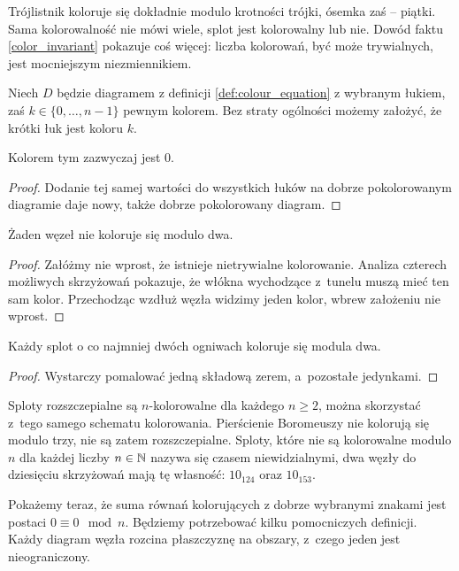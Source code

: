 Trójlistnik koloruje się dokładnie modulo krotności trójki, ósemka zaś -- piątki.
Sama kolorowalność nie mówi wiele, splot jest kolorowalny lub nie.
Dowód faktu \ref{color_invariant} pokazuje coś więcej: liczba kolorowań, być może trywialnych, jest mocniejszym niezmiennikiem.

\begin{lemma}
    \label{lem:colouring_arc}
    Niech $D$ będzie diagramem z definicji \ref{def:colour_equation} z wybranym łukiem, zaś $k \in \{0, \ldots, n - 1\}$ pewnym kolorem.
    Bez straty ogólności możemy założyć, że krótki łuk jest koloru $k$.
\end{lemma}

Kolorem tym zazwyczaj jest $0$.

\begin{proof}
    Dodanie tej samej wartości do wszystkich łuków na dobrze pokolorowanym diagramie daje nowy, także dobrze pokolorowany diagram.
\end{proof}

\begin{proposition}
    \label{no_knots_colours_mod_two}
    Żaden węzeł nie koloruje się modulo dwa.
\end{proposition}

\begin{proof}
    Załóżmy nie wprost, że istnieje nietrywialne kolorowanie.
    Analiza czterech możliwych skrzyżowań pokazuje, że włókna wychodzące z~tunelu muszą mieć ten sam kolor.
    Przechodząc wzdłuż węzła widzimy jeden kolor, wbrew założeniu nie wprost.
\end{proof}

\begin{proposition}
    Każdy splot o co najmniej dwóch ogniwach koloruje się modula dwa.
\end{proposition}

\begin{proof}
    Wystarczy pomalować jedną składową zerem, a~pozostałe jedynkami.
\end{proof}

Sploty rozszczepialne są $n$-kolorowalne dla każdego $n \ge 2$, można skorzystać z~tego samego schematu kolorowania.
Pierścienie Boromeuszy nie kolorują się modulo trzy, nie są zatem rozszczepialne.
Sploty, które nie są kolorowalne modulo $n$ dla każdej liczby $n \in \mathbb N$ nazywa się czasem niewidzialnymi, dwa węzły do dziesięciu skrzyżowań mają tę własność: $10_{124}$ oraz $10_{153}$.

Pokażemy teraz, że suma równań kolorujących z dobrze wybranymi znakami jest postaci $0 \equiv 0 \mod n$.
Będziemy potrzebować kilku pomocniczych definicji.
Każdy diagram węzła rozcina płaszczyznę na obszary, z~czego jeden jest nieograniczony.

